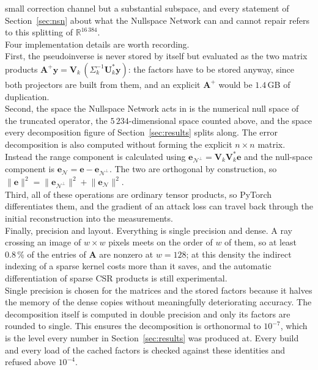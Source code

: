 \documentclass{article}
\numberwithin{equation}{section}
\begin{document}
small correction channel but a substantial subspace, and every statement of
Section~\ref{sec:nsn} about what the Nullspace Network can and cannot repair
refers to this splitting of $\mathbb{R}^{16\,384}$.\\
Four implementation details are worth recording.\\
First, the pseudoinverse is never stored by itself but evaluated as the two matrix products
$\mathbf{A}^+\mathbf{y}=\mathbf{V}_k\,(\Sigma_k^{-1}\mathbf{U}_k^{*}\mathbf{y})$: the factors have to be
stored anyway, since both projectors are built from them, and an explicit $\mathbf{A}^{+}$ would be
$1.4$\,GB of duplication.\\
Second, the space the Nullspace Network acts in is the numerical null space of the truncated operator, the
$5\,234$-dimensional space counted above, and the space every decomposition
figure of Section~\ref{sec:results} splits along. The error decomposition is also computed without forming the explicit $n\times n$ matrix.
Instead the range component is calculated using
$\mathbf{e}_{\mathcal{N}^\perp}=\mathbf{V}_k\mathbf{V}_k^{*}\mathbf{e}$ and the
null-space component is
$\mathbf{e}_\mathcal{N}=\mathbf{e}-\mathbf{e}_{\mathcal{N}^\perp}$. The two are
orthogonal by construction, so
$\lVert\mathbf{e}\rVert^2=\lVert\mathbf{e}_{\mathcal{N}^\perp}\rVert^2+
\lVert\mathbf{e}_\mathcal{N}\rVert^2$.\\
Third, all of these operations are ordinary tensor products, so PyTorch differentiates them, and the
gradient of an attack loss can travel back through the initial reconstruction into the measurements.\\
Finally, precision and layout. Everything is single precision and dense. A ray crossing an image of
$w\times w$ pixels meets on the order of $w$ of them, so at least $0.8\,\%$ of the entries of $\mathbf{A}$ are
nonzero at $w=128$; at this density the indirect indexing of a sparse kernel costs more than it saves, and
the automatic differentiation of sparse CSR products is still experimental.\\
Single precision is chosen for the matrices and the stored factors because it halves
the memory of the dense copies without meaningfully deteriorating accuracy. The
decomposition itself is computed in double precision and only its factors are rounded
to single. This ensures the decomposition is orthonormal to  $10^{-7}$, which is the level every number in
Section~\ref{sec:results} was produced at. Every build and every load of the cached factors is
checked against these identities and refused above $10^{-4}$.
\end{document}
